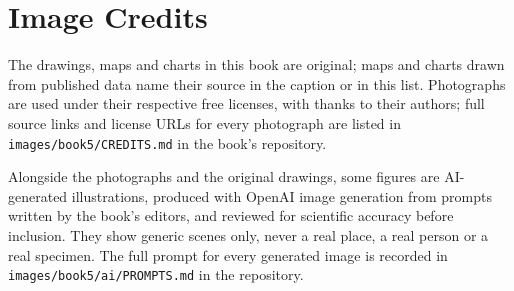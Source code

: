 \chapter*{Image Credits}

The drawings, maps and charts in this book are original; maps and charts
drawn from published data name their source in the caption or in this
list. Photographs are used under their respective free licenses, with
thanks to their authors; full source links and license URLs for every
photograph are listed in \texttt{images/book5/CREDITS.md} in the book's
repository.

\bigskip
Alongside the photographs and the original drawings, some figures are
AI-generated illustrations, produced with OpenAI image generation from
prompts written by the book's editors, and reviewed for scientific
accuracy before inclusion. They show generic scenes only, never a real
place, a real person or a real specimen. The full prompt for every
generated image is recorded in \texttt{images/book5/ai/PROMPTS.md} in the
repository.

